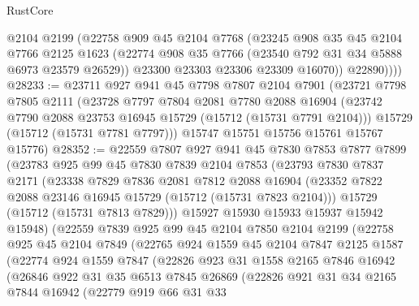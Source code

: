\begin{lexlean}{RustCore}
\begin{coremodule}
            @2104
            @2199
            (@22758
              @909
              @45
              @2104
              @7768
              (@23245
                @908
                @35
                @45
                @2104
                @7766
                @2125
                @1623
                (@22774 @908 @35 @7766 (@23540 @792 @31 @34 @5888 @6973 @23579 @26529))
                @23300
                @23303
                @23306
                @23309
                @16070))
            @22890))))
@28233 := @23711
    @927
    @941
    @45
    @7798
    @7807
    @2104
    @7901
    (@23721
      @7798
      @7805
      @2111
      (@23728
        @7797
        @7804
        @2081
        @7780
        @2088
        @16904
        (@23742 @7790 @2088 @23753 @16945 @15729 (@15712 (@15731 @7791 @2104)))
        @15729
        (@15712 (@15731 @7781 @7797)))
      @15747
      @15751
      @15756
      @15761
      @15767
      @15776)
@28352 := @22559
    @7807
    @927
    @941
    @45
    @7830
    @7853
    @7877
    @7899
    (@23783
      @925
      @99
      @45
      @7830
      @7839
      @2104
      @7853
      (@23793
        @7830
        @7837
        @2171
        (@23338
          @7829
          @7836
          @2081
          @7812
          @2088
          @16904
          (@23352 @7822 @2088 @23146 @16945 @15729 (@15712 (@15731 @7823 @2104)))
          @15729
          (@15712 (@15731 @7813 @7829)))
        @15927
        @15930
        @15933
        @15937
        @15942
        @15948)
      (@22559
        @7839
        @925
        @99
        @45
        @2104
        @7850
        @2104
        @2199
        (@22758
          @925
          @45
          @2104
          @7849
          (@22765
            @924
            @1559
            @45
            @2104
            @7847
            @2125
            @1587
            (@22774
              @924
              @1559
              @7847
              (@22826
                @923
                @31
                @1558
                @2165
                @7846
                @16942
                (@26846
                  @922
                  @31
                  @35
                  @6513
                  @7845
                  @26869
                  (@22826
                    @921
                    @31
                    @34
                    @2165
                    @7844
                    @16942
                    (@22779
                      @919
                      @66
                      @31
                      @33

\end{coremodule}
\end{lexlean}
